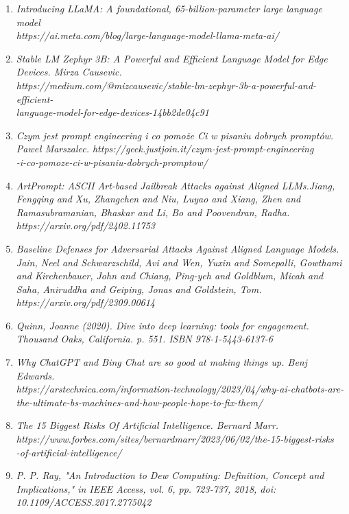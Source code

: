 \begin{enumerate}
\item {\textit {Introducing LLaMA: A foundational, 65-billion-parameter large language model \\ https://ai.meta.com/blog/large-language-model-llama-meta-ai/}}
\item {\textit {Stable LM Zephyr 3B: A Powerful and Efficient Language Model for Edge Devices. Mirza Causevic. \\ https://medium.com/@mizcausevic/stable-lm-zephyr-3b-a-powerful-and-efficient-\\language-model-for-edge-devices-14bb2de04c91}}
\item {\textit {Czym jest prompt engineering i co pomoże Ci w pisaniu dobrych promptów. Paweł Marszalec. https://geek.justjoin.it/czym-jest-prompt-engineering\\-i-co-pomoze-ci-w-pisaniu-dobrych-promptow/}}
\item {\textit {ArtPrompt: ASCII Art-based Jailbreak Attacks against Aligned LLMs.Jiang, Fengqing and Xu, Zhangchen and Niu, Luyao and Xiang, Zhen and Ramasubramanian, Bhaskar and Li, Bo and Poovendran, Radha. \\ https://arxiv.org/pdf/2402.11753 }}
\item {\textit {Baseline Defenses for Adversarial Attacks Against Aligned Language Models. Jain, Neel and Schwarzschild, Avi and Wen, Yuxin and Somepalli, Gowthami and Kirchenbauer, John and Chiang, Ping-yeh and Goldblum, Micah and Saha, Aniruddha and Geiping, Jonas and Goldstein, Tom. https://arxiv.org/pdf/2309.00614}}
\item {\textit {Quinn, Joanne (2020). Dive into deep learning: tools for engagement. Thousand Oaks, California. p. 551. ISBN 978-1-5443-6137-6}}
\item {\textit {Why ChatGPT and Bing Chat are so good at making things up. Benj Edwards. \\ https://arstechnica.com/information-technology/2023/04/why-ai-chatbots-are-\\the-ultimate-bs-machines-and-how-people-hope-to-fix-them/}}
\item {\textit {The 15 Biggest Risks Of Artificial Intelligence. Bernard Marr. \\ https://www.forbes.com/sites/bernardmarr/2023/06/02/the-15-biggest-risks\\-of-artificial-intelligence/}}
\item {\textit {P. P. Ray, "An Introduction to Dew Computing: Definition, Concept and Implications," in IEEE Access, vol. 6, pp. 723-737, 2018, doi: 10.1109/ACCESS.2017.2775042}}

\end{enumerate}
